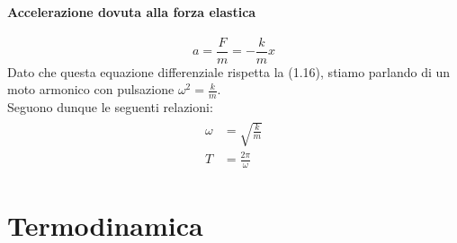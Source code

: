 \documentclass{report}
\begin{document}
\subsection{Accelerazione dovuta alla forza elastica}
\begin{equation*}
    a = \frac{F}{m} = -\frac{k}{m}x  
\end{equation*}
Dato che questa equazione differenziale rispetta la (1.16), stiamo parlando di un moto armonico 
con pulsazione \(\omega^2 = \frac{k}{m}\).\\
Seguono dunque le seguenti relazioni:
\begin{align}
    \begin{aligned}
        \omega & = \sqrt{\frac{k}{m}} \\
        T & = \frac{2\pi}{\omega}
    \end{aligned}
\end{align}





\part{Termodinamica}
\end{document}
